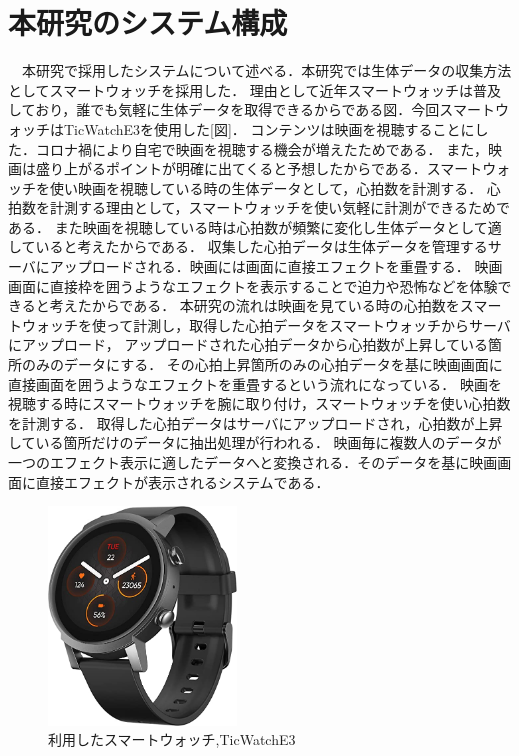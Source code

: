 \section{本研究のシステム構成}
　本研究で採用したシステムについて述べる．本研究では生体データの収集方法としてスマートウォッチを採用した．
理由として近年スマートウォッチは普及しており，誰でも気軽に生体データを取得できるからである図．今回スマートウォッチはTicWatchE3を使用した[図]．
コンテンツは映画を視聴することにした．コロナ禍により自宅で映画を視聴する機会が増えたためである．
また，映画は盛り上がるポイントが明確に出てくると予想したからである．スマートウォッチを使い映画を視聴している時の生体データとして，心拍数を計測する．
心拍数を計測する理由として，スマートウォッチを使い気軽に計測ができるためである．
また映画を視聴している時は心拍数が頻繁に変化し生体データとして適していると考えたからである．
収集した心拍データは生体データを管理するサーバにアップロードされる．映画には画面に直接エフェクトを重畳する．
映画画面に直接枠を囲うようなエフェクトを表示することで迫力や恐怖などを体験できると考えたからである．
本研究の流れは映画を見ている時の心拍数をスマートウォッチを使って計測し，取得した心拍データをスマートウォッチからサーバにアップロード，
アップロードされた心拍データから心拍数が上昇している箇所のみのデータにする．
その心拍上昇箇所のみの心拍データを基に映画画面に直接画面を囲うようなエフェクトを重畳するという流れになっている．
映画を視聴する時にスマートウォッチを腕に取り付け，スマートウォッチを使い心拍数を計測する．
取得した心拍データはサーバにアップロードされ，心拍数が上昇している箇所だけのデータに抽出処理が行われる．
映画毎に複数人のデータが一つのエフェクト表示に適したデータへと変換される．そのデータを基に映画画面に直接エフェクトが表示されるシステムである．

\begin{figure}[H]
    \centering
    \includegraphics[width=5cm]{images/chapter3/watch.jpg}
    \caption{利用したスマートウォッチ,TicWatchE3}
\end{figure}

